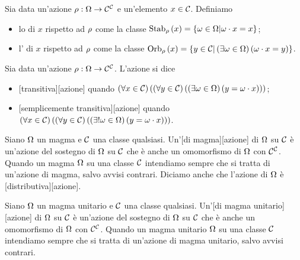 \begin{Definition}
	Sia data un'azione $\rho: \Omega \rightarrow \mathcal{C}^{\mathcal{C}}$ e un'elemento $x \in \mathcal{C}$. Definiamo
	\begin{itemize}
		\item lo  di $x$ rispetto ad $\rho$ come la classe $\Stabilizer{x}[\Action] = \lbrace \Operator \in \Operators | \Operator \cdot x = x \rbrace$;
		\item l' di $x$ rispetto ad $\rho$ come la classe $\Orbit{x}[\Action] = \lbrace y \in \Class | \Exists{\Operator \in \Operators}{\Operator \cdot x = y} \rbrace$.
	\end{itemize}
\end{Definition}
\begin{Definition}
	Sia data un'azione
	$\rho: \Omega \rightarrow \mathcal{C}^{\mathcal{C}}$.
	L'azione si dice
	\begin{itemize}
		\item
		[transitiva][azione]
		quando
		$\left ( \forall x \in \mathcal{C} \right ) \left ( \left ( \forall y \in \mathcal{C} \right ) \left ( \left ( \exists \omega \in \Omega \right ) \left ( y = \omega \cdot x \right ) \right ) \right )$;
		\item
		[semplicemente transitiva][azione]
		quando
		$\left ( \forall x \in \mathcal{C} \right ) \left ( \left ( \forall y \in \mathcal{C} \right ) \left ( \left ( \exists ! \omega \in \Omega \right ) \left ( y = \omega \cdot x \right ) \right ) \right )$.
	\end{itemize}
\end{Definition}
\begin{Definition}
	Siano $\Omega$ un magma e $\mathcal{C}$ una classe qualsiasi. Un'[di magma][azione] di $\Omega$ su $\mathcal{C}$ \`e un'azione del sostegno di $\Omega$ su $\mathcal{C}$ che \`e anche un omomorfismo di $\Omega$ con $\mathcal{C}^{\mathcal{C}}$. Quando un magma $\Omega$  su una classe $\mathcal{C}$ intendiamo sempre che si tratta di un'azione di magma, salvo avvisi contrari.
	Diciamo anche che l'azione di $\Omega$ \`e
	[distributiva][azione].
\end{Definition}
\begin{Definition}
	Siano $\Omega$ un magma unitario e $\mathcal{C}$ una classe qualsiasi. Un'[di magma unitario][azione] di $\Omega$ su $\mathcal{C}$ \`e un'azione del sostegno di $\Omega$ su $\mathcal{C}$ che \`e anche un omomorfismo di $\Omega$ con $\mathcal{C}^{\mathcal{C}}$. Quando un magma unitario $\Omega$  su una classe $\mathcal{C}$ intendiamo sempre che si tratta di un'azione di magma unitario, salvo avvisi contrari.
\end{Definition}
